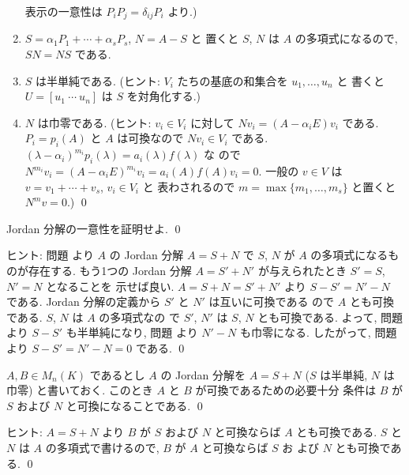 \documentclass[12pt,twoside]{jarticle}
\begin{document}
\begin{question}
\begin{enumerate}
    表示の一意性は $P_i P_j = \delta_{ij} P_i$ より.)
  \item $S = \alpha_1 P_1 + \cdots + \alpha_s P_s$, $N=A-S$ と
    置くと $S$, $N$ は $A$ の多項式になるので, $SN=NS$ である.
  \item $S$ は半単純である.
    (ヒント: $V_i$ たちの基底の和集合を $u_1,\dots,u_n$ と
    書くと $U=[u_1\ \cdots\ u_n]$ は $S$ を対角化する.)
  \item $N$ は巾零である.
    (ヒント: $v_i\in V_i$ に対して $Nv_i = (A - \alpha_iE)v_i$ である.
    $P_i=p_i(A)$ と $A$ は可換なので $Nv_i\in V_i$ である.
    $(\lambda-\alpha_i)^{m_i}p_i(\lambda)=a_i(\lambda)f(\lambda)$ な
    ので $N^{m_i}v_i = (A - \alpha_iE)^{m_i}v_i 
    = a_i(A)f(A)v_i = 0$.
    一般の $v\in V$ は $v=v_1+\cdots+v_s$, $v_i\in V_i$ と
    表わされるので $m = \max\{m_1,\dots,m_s\}$ と置くと $N^mv=0$.)
    \qed
  \end{enumerate}
\end{question}


\begin{question}
\label{q:Jordan-decomp-2}
  Jordan 分解の一意性を証明せよ. \qed
\end{question}

\noindent
ヒント: 問題  より $A$ の 
Jordan 分解 $A=S+N$ で $S$, $N$ が $A$ の多項式になるものが存在する.
もう1つの Jordan 分解 $A=S'+N'$ が与えられたとき $S'=S$, $N'=N$ となることを
示せば良い.  $A=S+N=S'+N'$ より $S-S'=N'-N$ である.
Jordan 分解の定義から $S'$ と $N'$ は互いに可換である
ので $A$ とも可換である.  $S$, $N$ は $A$ の多項式なの
で $S'$, $N'$ は $S$, $N$ とも可換である.
よって, 問題  より $S-S'$ も半単純になり,
問題  より $N'-N$ も巾零になる.
したがって, 問題  より $S-S'=N'-N=0$ である.
\qed


\begin{question}
\label{q:Jordan-decomp-4}
  $A,B\in M_n(K)$ であるとし $A$ の Jordan 分解を $A=S+N$ ($S$ は半単純, 
  $N$ は巾零) と書いておく.  このとき $A$ と $B$ が可換であるための必要十分
  条件は $B$ が $S$ および $N$ と可換になることである.
  \qed
\end{question}

\noindent
ヒント: $A=S+N$ より $B$ が $S$ および $N$ と可換ならば $A$ とも可換である.
$S$ と $N$ は $A$ の多項式で書けるので,  $B$ が $A$ と可換ならば $S$ お
よび $N$ とも可換である.
\qed
\end{document}
